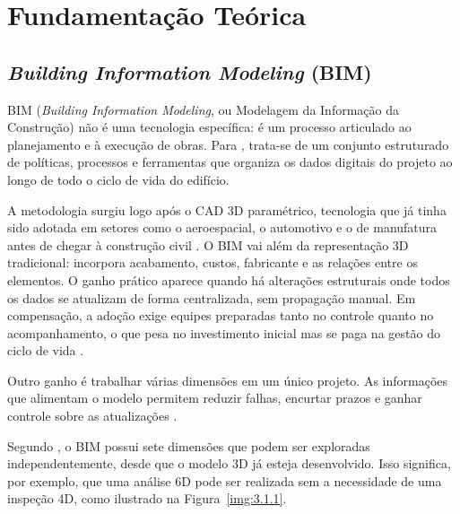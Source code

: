 \chapter{Fundamentação Teórica}

\section{\textit{Building Information Modeling} (BIM)}

BIM (\textit{Building Information Modeling}, ou Modelagem da Informação da Construção) não é uma tecnologia específica: é um processo articulado ao planejamento e à execução de obras. Para , trata-se de um conjunto estruturado de políticas, processos e ferramentas que organiza os dados digitais do projeto ao longo de todo o ciclo de vida do edifício.

A metodologia surgiu logo após o CAD 3D paramétrico, tecnologia que já tinha sido adotada em setores como o aeroespacial, o automotivo e o de manufatura antes de chegar à construção civil \cite{eastman2011}. O BIM vai além da representação 3D tradicional: incorpora acabamento, custos, fabricante e as relações entre os elementos. O ganho prático aparece quando há alterações estruturais onde todos os dados se atualizam de forma centralizada, sem propagação manual. Em compensação, a adoção exige equipes preparadas tanto no controle quanto no acompanhamento, o que pesa no investimento inicial mas se paga na gestão do ciclo de vida \cite{coelho2018}.

Outro ganho é trabalhar várias dimensões em um único projeto. As informações que alimentam o modelo permitem reduzir falhas, encurtar prazos e ganhar controle sobre as atualizações \cite{parreira2013}.

Segundo , o BIM possui sete dimensões que podem ser exploradas independentemente, desde que o modelo 3D já esteja desenvolvido. Isso significa, por exemplo, que uma análise 6D pode ser realizada sem a necessidade de uma inspeção 4D, como ilustrado na Figura~\ref{img:3.1.1}.

